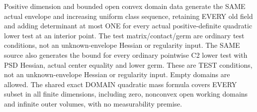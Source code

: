 \begin{lemma}
  \label{lem:perron-quadratic-lower-test}
  \leanok
  Positive dimension and bounded open convex domain data generate the SAME
  actual envelope and increasing uniform class sequence, retaining EVERY old
  field and adding determinant at most ONE for every actual positive-definite
  quadratic lower test at an interior point. The test matrix/contact/germ are
  ordinary test conditions, not an unknown-envelope Hessian or regularity input.
  The SAME source also generates the bound for every ordinary pointwise C2
  lower test with PSD Hessian, actual center equality and lower germ. These
  are TEST conditions, not an unknown-envelope Hessian or regularity input.
  Empty domains are allowed. The shared exact DOMAIN quadratic mass formula
  covers EVERY subset in all finite dimensions, including zero, nonconvex open
  working domains and infinite outer volumes, with no measurability premise.
\end{lemma}
